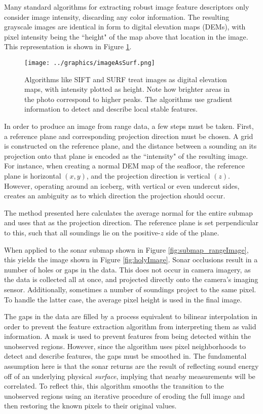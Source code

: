 Many standard algorithms for extracting robust image feature descriptors only consider image intensity, discarding any color information. The resulting grayscale images are identical in form to digital elevation maps (DEMs), with pixel intensity being the ``height" of the map above that location in the image. This representation is shown in Figure \ref{fig:imAsSurf}. 

\begin{figure}[htb]
   \centering
   \texttt{[image: ../graphics/imageAsSurf.png]} %
   \caption{Algorithms like SIFT and SURF treat images as digital elevation maps, with intensity plotted as height. Note how brighter areas in the photo correspond to higher peaks. The algorithms use gradient information to detect and describe local stable features.}
   \label{fig:imAsSurf}
\end{figure}

In order to produce an image from range data, a few steps must be taken. First, a reference plane and corresponding projection direction must be chosen. A grid is constructed on the reference plane, and the distance between a sounding an its projection onto that plane is encoded as the ``intensity" of the resulting image. For instance, when creating a normal DEM map of the seafloor, the reference plane is horizontal $(x,y)$, and the projection direction is vertical $(z)$. However, operating around an iceberg, with vertical or even undercut sides, creates an ambiguity as to which direction the projection should occur. 

The method presented here calculates the average normal for the entire submap and uses that as the projection direction. The reference plane is set perpendicular to this, such that all soundings lie on the positive-$z$ side of the plane.

When applied to the sonar submap shown in Figure \ref{fig:submap_rangeImage}, this yields the image shown in Figure \ref{fig:holyImage}. Sonar occlusions result in a number of holes or gaps in the data. This does not occur in camera imagery, as the data is collected  all at once, and projected directly onto the camera's imaging sensor. Additionally, sometimes a number of soundings project to the same pixel. To handle the latter case, the average pixel height is used in the final image. 

The gaps in the data are filled by a process equivalent to bilinear interpolation in order to prevent the feature extraction algorithm from interpreting them as valid information. A mask is used to prevent features from being detected within the unobserved regions. However, since the algorithm uses pixel neighborhoods to detect and describe features, the gaps must be smoothed in. The fundamental assumption here is that the sonar returns are the result of reflecting sound energy off of an underlying physical \emph{surface}, implying that nearby measurements will be correlated.  To reflect this, this algorithm smooths the transition to the unobserved regions using an iterative procedure of eroding the full image and then restoring the known pixels to their original values.


